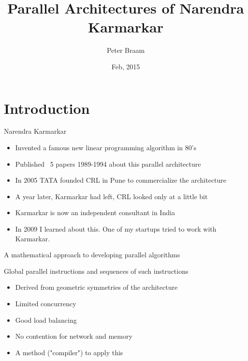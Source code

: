 \documentclass{beamer}
\author[Peter Braam]{Peter Braam}
\title[Karmarkar Architectures\hspace{2em}\insertframenumber/\inserttotalframenumber]{Parallel Architectures of Narendra Karmarkar}
\date{Feb, 2015} %
\institute{Braam Research, LLC \& University of Cambridge}
\begin{document}

\maketitle

\tableofcontents 

\section{Introduction}

\begin{frame}{Narendra Karmarkar}


\begin{itemize}
\item Invented a famous new linear programming algorithm in 80's
\item Published ~5 papers 1989-1994 about this parallel architecture
\item In 2005 TATA founded CRL in Pune to commercialize the architecture
\item A year later, Karmarkar had left, CRL looked only at a little bit
\item Karmarkar is now an independent consultant in India
\item In 2009 I learned about this. One of my startups tried to work with Karmarkar.
\end{itemize}
\end{frame}

\begin{frame}{A mathematical approach to developing parallel algorithms}

\begin{block}{
Global parallel instructions and sequences of such instructions}
\begin{itemize}
\item Derived from geometric symmetries of the architecture
\item Limited concurrency
\item Good load balancing
\item No contention for network and memory 
\item A method ("compiler") to apply this
\end{itemize}
\end{block}
\end{frame}
\end{document}
